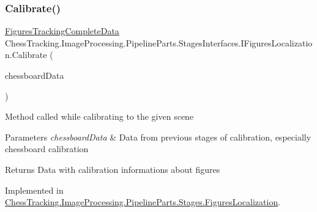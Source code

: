 \subsubsection{\texorpdfstring{Calibrate()}{Calibrate()}}
{\footnotesize\ttfamily \mbox{\hyperlink{class_chess_tracking_1_1_image_processing_1_1_pipeline_data_1_1_figures_tracking_complete_data}{Figures\+Tracking\+Complete\+Data}} Chess\+Tracking.\+Image\+Processing.\+Pipeline\+Parts.\+Stages\+Interfaces.\+I\+Figures\+Localization.\+Calibrate (\begin{DoxyParamCaption}\item[{\mbox{\hyperlink{class_chess_tracking_1_1_image_processing_1_1_pipeline_data_1_1_chessboard_tracking_complete_data}{Chessboard\+Tracking\+Complete\+Data}}}]{chessboard\+Data }\end{DoxyParamCaption})}



Method called while calibrating to the given scene 


\begin{DoxyParams}{Parameters}
{\em chessboard\+Data} & Data from previous stages of calibration, especially chessboard calibration\\
\hline
\end{DoxyParams}
\begin{DoxyReturn}{Returns}
Data with calibration informations about figures
\end{DoxyReturn}


Implemented in \mbox{\hyperlink{class_chess_tracking_1_1_image_processing_1_1_pipeline_parts_1_1_stages_1_1_figures_localization_aa4fc69a70edd3ecc04d778972071d491}{Chess\+Tracking.\+Image\+Processing.\+Pipeline\+Parts.\+Stages.\+Figures\+Localization}}.

\mbox{\label{interface_chess_tracking_1_1_image_processing_1_1_pipeline_parts_1_1_stages_interfaces_1_1_i_figures_localization_aaa05ccf9e70cdf5a9f11dc967cfb2d39}} 
